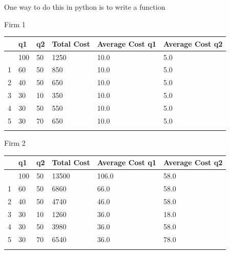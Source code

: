\documentclass[
  ignorenonframetext,
]{beamer}
\begin{document}
\begin{frame}
\begin{block}{One way to do this in python is to write a function}
\label{one-way-to-do-this-in-python-is-to-write-a-function}
\pause
\end{block}
\end{frame}

\begin{frame}
\begin{block}{Firm 1}
\label{firm-1}
\begin{longtable}[]{@{}llllll@{}}
\toprule\noalign{}
& q1 & q2 & Total Cost & Average Cost q1 & Average Cost q2 \\
\midrule\noalign{}
\endhead
0 & 100 & 50 & 1250 & 10.0 & 5.0 \\
1 & 60 & 50 & 850 & 10.0 & 5.0 \\
2 & 40 & 50 & 650 & 10.0 & 5.0 \\
3 & 30 & 10 & 350 & 10.0 & 5.0 \\
4 & 30 & 50 & 550 & 10.0 & 5.0 \\
5 & 30 & 70 & 650 & 10.0 & 5.0 \\
\bottomrule\noalign{}
\end{longtable}
\end{block}
\end{frame}

\begin{frame}
\begin{block}{Firm 2}
\label{firm-2}
\begin{longtable}[]{@{}llllll@{}}
\toprule\noalign{}
& q1 & q2 & Total Cost & Average Cost q1 & Average Cost q2 \\
\midrule\noalign{}
\endhead
0 & 100 & 50 & 13500 & 106.0 & 58.0 \\
1 & 60 & 50 & 6860 & 66.0 & 58.0 \\
2 & 40 & 50 & 4740 & 46.0 & 58.0 \\
3 & 30 & 10 & 1260 & 36.0 & 18.0 \\
4 & 30 & 50 & 3980 & 36.0 & 58.0 \\
5 & 30 & 70 & 6540 & 36.0 & 78.0 \\
\bottomrule\noalign{}
\end{longtable}
\end{block}
\end{frame}
\end{document}
